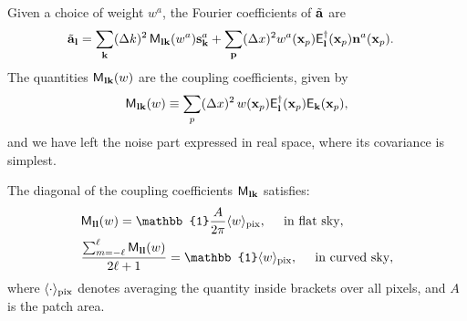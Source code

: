 \documentclass[a4paper,11pt]{article}
\begin{document}
      Given a choice of weight $w^a$, the Fourier coefficients of $\tilde{\bf a}$ are
      \begin{align}
        \tilde{\bf a}_{\bf l}&=\sum_{\bf k}(\Delta k)^2\,{\sf M}_{{\bf l}{\bf k}}(w^a){\bf s}^a_{\bf k}+\sum_{\bf p}({\Delta}x)^2w^a({\bf x}_p){\sf E}^\dagger_{\bf l}({\bf x}_p){\bf n}^a({\bf x}_p).
      \end{align}
      The quantities ${\sf M}_{{\bf l}{\bf k}}(w)$ are the coupling coefficients, given by
      \begin{equation}
        {\sf M}_{{\bf l}{\bf k}}(w)\equiv\sum_{p}(\Delta x)^2\,w({\bf x}_p){\sf E}^\dagger_{\bf l}({\bf x}_p){\sf E}_{\bf k}({\bf x}_p),
      \end{equation}
      and we have left the noise part expressed in real space, where its covariance is simplest.
 
      The diagonal of the coupling coefficients ${\sf M}_{{\bf l}{\bf k}}$ satisfies:
      \begin{align}\label{eq:coup_diag}
        &{\sf M}_{{\bf l}{\bf l}}(w) = \mathbb{1}\frac{A}{2\pi}\langle w\rangle_{\rm pix},\hspace{12pt}\,\text{in flat sky},\\
        &\frac{\sum_{m=-\ell}^\ell{\sf M}_{{\bf l}{\bf l}}(w)}{2\ell+1} = \mathbb{1}\langle w\rangle_{\rm pix},\hspace{12pt}\,\text{in curved sky},
      \end{align}
      where $\langle\cdot\rangle_{\rm pix}$ denotes averaging the quantity inside brackets over all pixels, and $A$ is the patch area.
\end{document}
